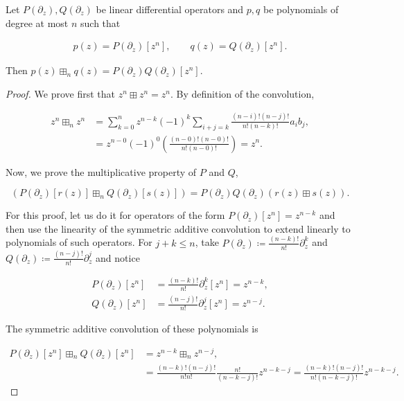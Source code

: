 \begin{theorem} \label{thm:multiplicative_operators}
    Let $P(\partial_z), Q(\partial_z)$ be linear differential operators and $p,q$ be polynomials of degree at most $n$ such that

    \begin{align*}
        p(z) = P(\partial_z)[z^n], \qquad q(z) =Q(\partial_z)[z^n].
    \end{align*}

    Then $p(z) \boxplus_n q(z) = P(\partial_z)Q(\partial_z)[z^n]$.
\end{theorem}

\begin{proof}
    We prove first that $z^n \boxplus z^n = z^n$. By definition of the convolution,
    
    \begin{align*}
        z^n \boxplus_n z^n &= \sum_{k=0}^n z^{n-k}(-1)^k \sum_{i+j = k} \frac{(n-i)!(n-j)!}{n!(n-k)!}a_i b_j, \\
        &= z^{n-0}(-1)^0\left( \frac{(n-0)!(n-0)!}{n!(n-0)!}\right) = z^n.
    \end{align*}

    Now, we prove the multiplicative property of $P$ and $Q$,

    \begin{equation*}
        \left( P(\partial_z)[r(z)] \boxplus_n Q(\partial_z)[s(z)] \right) = P(\partial_z) Q(\partial_z)(r(z) \boxplus s(z)).
    \end{equation*}

    For this proof, let us do it for operators of the form $P(\partial_z)[z^n] = z^{n-k}$ and then use the linearity of the symmetric additive convolution to extend linearly to polynomials of such operators. For $j+k\le n$, take $P(\partial_z) \coloneqq \frac{(n-k)!}{n!}\partial_z^k$ and $Q(\partial_z) \coloneqq \frac{(n-j)!}{n!}\partial_z^j$ and notice

    \begin{align*}
        P(\partial_z)[z^n] &= \frac{(n-k)!}{n!} \partial_z^k[z^n] = z^{n-k},\\
        Q(\partial_z)[z^n] &= \frac{(n-j)!}{n!} \partial_z^j[z^n] = z^{n-j}.
    \end{align*}

    The symmetric additive convolution of these polynomials is 

    \begin{align*}
        P(\partial_z)[z^n] \boxplus_n Q(\partial_z)[z^n] &= z^{n-k}\boxplus_n z^{n-j},\\
        &= \frac{(n-k)!(n-j)!}{n!n!}\frac{n!}{(n-k-j)!}z^{n-k-j} = \frac{(n-k)!(n-j)!}{n!(n-k-j)!}z^{n-k-j}.
    \end{align*}


\end{proof}
